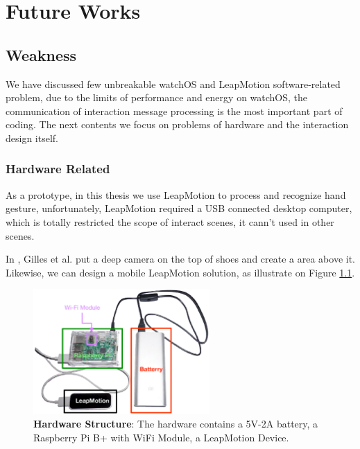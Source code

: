 \chapter{Future Works}

\section{Weakness}


We have discussed few unbreakable watchOS and LeapMotion software-related problem, due to the limits of performance and energy on watchOS, the communication of interaction message processing is the most important part of coding. The next contents we focus on problems of hardware and the interaction design itself.

\subsection{Hardware Related}

As a prototype, in this thesis we use LeapMotion to process and recognize hand gesture, unfortunately, LeapMotion required a USB connected desktop computer,  which is totally restricted the scope of interact scenes, it cann't used in other scenes.

In \cite{Bailly:2012:SNP:2207676.2208576}, Gilles et al. put a deep camera on the top of shoes and create a area above it. Likewise, we can design a mobile LeapMotion solution, as illustrate on Figure \ref{fig:hardware}.

\begin{figure}[H]
    \kaishu
    \centering
    \includegraphics[width=0.6\textwidth]{figures/hardware}
    \caption{\kaishu \textbf{Hardware Structure}: The hardware contains a 5V-2A battery, a Raspberry Pi B+ with WiFi Module, a LeapMotion Device.}
    \label{fig:hardware}
\end{figure}


